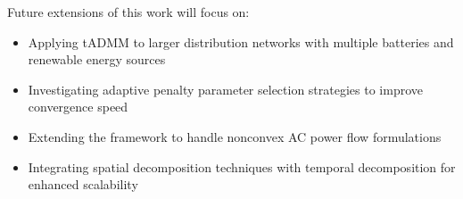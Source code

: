 Future extensions of this work will focus on:
\begin{itemize}
    \item Applying tADMM to larger distribution networks with multiple batteries and renewable energy sources
    \item Investigating adaptive penalty parameter selection strategies to improve convergence speed
    \item Extending the framework to handle nonconvex AC power flow formulations
    \item Integrating spatial decomposition techniques with temporal decomposition for enhanced scalability
\end{itemize}

